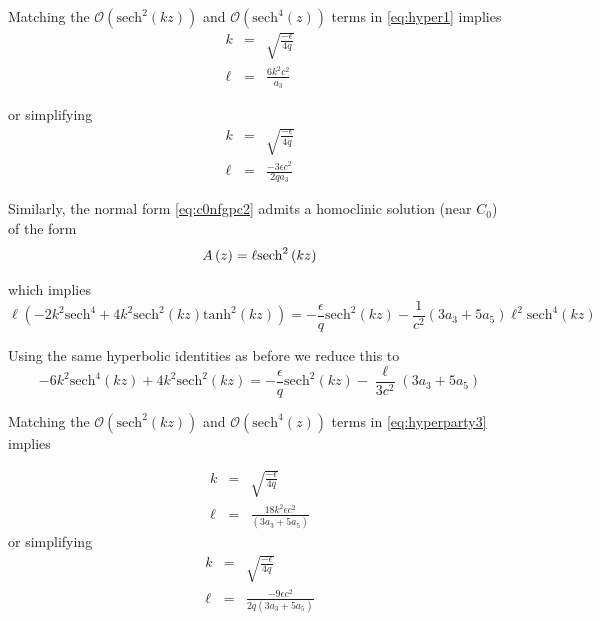 Matching the $\mathcal{O}\left(\mathrm{sech}^2\left(k z\right)\right)$  and   $\mathcal{O}\left(\mathrm{sech}^4\left(z\right)\right)$ terms in \eqref{eq:hyper1} implies
\begin{subequations} 
\begin{eqnarray}
k &=& \sqrt{\frac{-\epsilon}{4q}}  \\
\ell &=& \frac{ 6 k^2 c^2 }{ a_3 } 
\end{eqnarray}
\end{subequations}

or simplifying
\begin{subequations} 
\begin{eqnarray}
k &=& \sqrt{\frac{-\epsilon}{4q}}  \\
\ell &=& \frac{ - 3 \epsilon c^2 }{2 q a_3 } 
\end{eqnarray}
\end{subequations}

Similarly, the normal form \eqref{eq:c0nfgpc2} admits a homoclinic solution (near $C_0$) of the form 
\begin{equation}\label{eq:solitongpc2}
A\left(z\right) = \ell \space \mathrm{sech}^2\left(k z\right)
\end{equation}

which implies
\begin{equation}\label{eq:hyperparty2}
\ell \left( -2 k^2 \mathrm{sech}^4 + 4 k^2 \mathrm{sech}^2\left(kz\right) \mathrm{tanh}^2\left(kz\right) \right) = - \frac{\epsilon}{q} \mathrm{sech}^2(kz) - \frac{1}{c^2}\left(3a_3 + 5a_5\right) \ell^2 \mathrm{sech}^4(kz) 
\end{equation}

Using the same hyperbolic identities as before we reduce this to
\begin{equation}\label{eq:hyperparty3}
-6 k^2 \mathrm{sech}^4\left(k z\right) + 4 k^2 \mathrm{sech}^2\left(k z\right)=
-\frac{\epsilon}{q} \mathrm{sech}^2\left(k z\right) - \frac{\ell}{3c^2}\left(3a_3 + 5a_5\right) 
\end{equation}

Matching the $\mathcal{O}\left(\mathrm{sech}^2\left(k z\right)\right)$  and   $\mathcal{O}\left(\mathrm{sech}^4\left(z\right)\right)$ terms in \eqref{eq:hyperparty3} implies

\begin{subequations} 
\begin{eqnarray}
k &=& \sqrt{\frac{-\epsilon}{4q}} \label{eq:keq} \\
\ell &=& \frac{ 18 k^2 \epsilon c^2 }{ \left(3 a_3 + 5 a_5\right) } 
\end{eqnarray}
\end{subequations}
or simplifying
\begin{subequations} 
\begin{eqnarray}
k &=& \sqrt{\frac{-\epsilon}{4q}} \label{eq:keq} \\
\ell &=& \frac{ - 9 \epsilon c^2 }{2 q \left(3 a_3 + 5 a_5\right) } 
\end{eqnarray}
\end{subequations}

